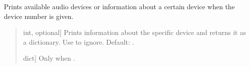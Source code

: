 \documentclass[letterpaper,10pt,english]{sphinxmanual}
\begin{document}
\begin{fulllineitems}
\label{\detokenize{modules/dsptoolbox.measure:dsptoolbox.measure.print_device_info}}
\pysigstartsignatures
{}
\pysigstopsignatures
\sphinxAtStartPar
Prints available audio devices or information about a certain device
when the device number is given.
\begin{quote}\begin{description}
\begin{description}
\sphinxlineitem{\sphinxstylestrong{device\_number}}{[}int, optional{]}
\sphinxAtStartPar
Prints information about the specific device and returns it as
a dictionary. Use  to ignore. Default: .

\end{description}

\begin{description}
\sphinxlineitem{\sphinxstylestrong{d}}{[}dict{]}
\sphinxAtStartPar
Only when .

\end{description}

\end{description}\end{quote}

\end{fulllineitems}

\end{document}
